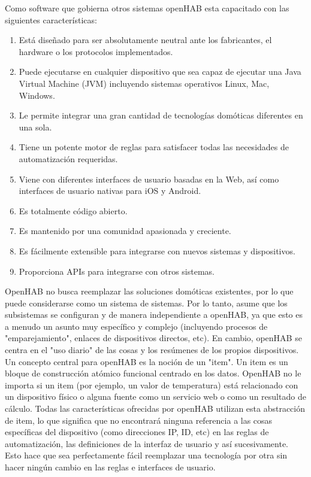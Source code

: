 Como software que gobierna otros sistemas openHAB esta capacitado con las siguientes características:
\begin{enumerate}
\item Está diseñado para ser absolutamente neutral ante los fabricantes, el hardware o los protocolos implementados.
\item Puede ejecutarse en cualquier dispositivo que sea capaz de ejecutar una Java Virtual Machine (JVM) incluyendo sistemas operativos Linux, Mac, Windows.
\item Le permite integrar una gran cantidad de tecnologías domóticas diferentes en una sola.
\item Tiene un potente motor de reglas para satisfacer todas las necesidades de automatización requeridas.
\item Viene con diferentes interfaces de usuario basadas en la Web, así como interfaces de usuario nativas para iOS y Android.
\item Es totalmente código abierto.
\item Es mantenido por una comunidad apasionada y creciente.
\item Es fácilmente extensible para integrarse con nuevos sistemas y dispositivos.
\item Proporciona APIs para integrarse con otros sistemas.
\end{enumerate}

OpenHAB no busca reemplazar las soluciones domóticas existentes, por lo que puede considerarse como un sistema de sistemas. Por lo tanto, asume que los subsistemas se configuran y de manera independiente a openHAB, ya que esto es a menudo un asunto muy específico y complejo (incluyendo procesos de "emparejamiento", enlaces de dispositivos directos, etc). En cambio, openHAB se centra en el "uso diario" de las cosas y los resúmenes de los propios dispositivos.\\

Un concepto central para openHAB es la noción de un "item". Un item es un bloque de construcción atómico funcional centrado en los datos. OpenHAB no le importa si un item (por ejemplo, un valor de temperatura) está relacionado con un dispositivo físico o alguna fuente como un servicio web o como un resultado de cálculo. Todas las características ofrecidas por openHAB utilizan esta abstracción de item, lo que significa que no encontrará ninguna referencia a las cosas específicas del dispositivo (como direcciones IP, ID, etc) en las reglas de automatización, las definiciones de la interfaz de usuario y así sucesivamente. Esto hace que sea perfectamente fácil reemplazar una tecnología por otra sin hacer ningún cambio en las reglas e interfaces de usuario.\\

